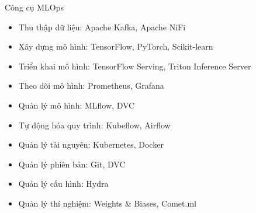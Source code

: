 \documentclass{beamer}
\begin{document}
\begin{frame}{Công cụ MLOps}

        \begin{itemize}
            \item Thu thập dữ liệu: Apache Kafka, Apache NiFi
            \item Xây dựng mô hình: TensorFlow, PyTorch, Scikit-learn
            \item Triển khai mô hình: TensorFlow Serving, Triton Inference Server
            \item Theo dõi mô hình: Prometheus, Grafana
            \item Quản lý mô hình: MLflow, DVC
            \item Tự động hóa quy trình: Kubeflow, Airflow
            \item Quản lý tài nguyên: Kubernetes, Docker
            \item Quản lý phiên bản: Git, DVC
            \item Quản lý cấu hình: Hydra
            \item Quản lý thí nghiệm: Weights \& Biases, Comet.ml
        \end{itemize}

\end{frame}


\end{document}
